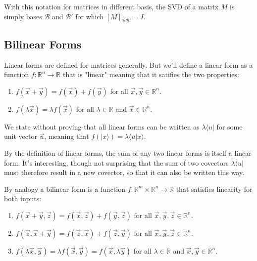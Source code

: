 \documentclass{amsbook}
\begin{document}
With this notation for matrices in different basis, the SVD of a matrix $M$ is simply bases $\mathcal B$ and $\mathcal B'$ for which $[M]_{\mathcal B\mathcal B'}=I$.

\subsection{Bilinear Forms}

Linear forms are defined for matrices generally.  But we'll define a linear form as a function $f:\mathbb R^n \to\mathbb R$ that is "linear" meaning that it satifies the two properties:

\begin{enumerate}
\item $f\left(\vec x+\vec y\right)=f\left(\vec x\right) + f\left(\vec y\right)$ for all $\vec x,\vec y\in\mathbb R^n$.
\item $f\left(\lambda\vec x\right)=\lambda f\left(\vec x\right)$ for all $\lambda\in\mathbb R$ and $\vec x\in\mathbb R^n$.
\end{enumerate}

We state without proving that all linear forms can be written as $\lambda\langle u|$ for some unit vector $\vec u$, meaning that $f\left(|x\rangle\right)=\lambda\langle u|x\rangle$.

By the definition of linear forms, the sum of any two linear forms is itself a linear form.  It's interesting, though not surprising that the sum of two covectors $\lambda\langle u|$ must therefore result in a new covector, so that it can also be written this way.

By analogy a bilinear form is a function $f:\mathbb R^m\times\mathbb R^n \to\mathbb R$ that satisfies linearity for both inputs:

\begin{enumerate}
\item $f\left(\vec x+\vec y,\vec z\right)=f\left(\vec x,\vec z\right) + f\left(\vec y,\vec z\right)$ for all $\vec x,\vec y,\vec z\in\mathbb R^n$.
\item $f\left(\vec z,\vec x+\vec y\right)=f\left(\vec z,\vec x\right) + f\left(\vec z,\vec y\right)$ for all $\vec x,\vec y,\vec z\in\mathbb R^n$.
\item $f\left(\lambda\vec x,\vec y\right)=\lambda f\left(\vec x,\vec y\right)=f\left(\vec x,\lambda\vec y\right)$ for all $\lambda\in\mathbb R$ and $\vec x,\vec y\in\mathbb R^n$.
\end{enumerate}
\end{document}
